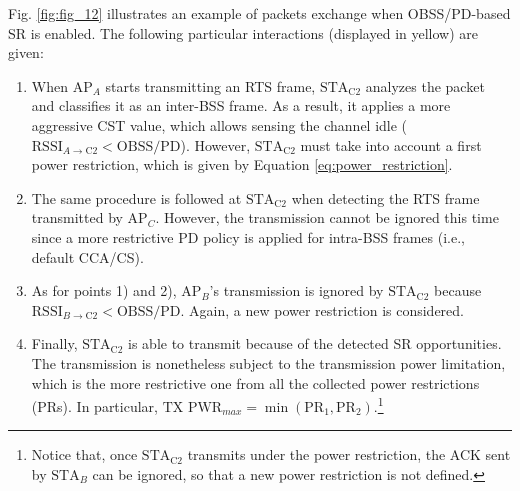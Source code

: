 \documentclass[comsoc]{IEEEtran}
\begin{document}
	Fig. \ref{fig:fig_12} illustrates an example of packets exchange when OBSS/PD-based SR is enabled. The following particular interactions (displayed in yellow) are given:
	\begin{enumerate}
		\item When $\text{AP}_A$ starts transmitting an RTS frame, $\text{STA}_\text{C2}$ analyzes the packet and classifies it as an inter-BSS frame. As a result, it applies a more aggressive CST value, which allows sensing the channel idle ($\text{RSSI}_{A \rightarrow \text{C2}} < \text{OBSS/PD}$). However, $\text{STA}_\text{C2}$ must take into account a first power restriction, which is given by Equation \eqref{eq:power_restriction}.
		\item The same procedure is followed at $\text{STA}_\text{C2}$ when detecting the RTS frame transmitted by $\text{AP}_C$. However, the transmission cannot be ignored this time since a more restrictive PD policy is applied for intra-BSS frames (i.e., default CCA/CS).
		\item As for points 1) and 2), $\text{AP}_B$'s transmission is ignored by $\text{STA}_\text{C2}$ because $\text{RSSI}_{B \rightarrow \text{C2}} < \text{OBSS/PD}$. Again, a new power restriction is considered.
		\item Finally, $\text{STA}_\text{C2}$ is able to transmit because of the detected SR opportunities. The transmission is nonetheless subject to the transmission power limitation, which is the more restrictive one from all the collected power restrictions (PRs). In particular, $\text{TX PWR}_{max} = \min(\text{PR}_1, \text{PR}_2)$.\footnote{Notice that, once $\text{STA}_\text{C2}$ transmits under the power restriction, the ACK sent by $\text{STA}_B$ can be ignored, so that a new power restriction is not defined.}
	\end{enumerate}
	
\end{document}
